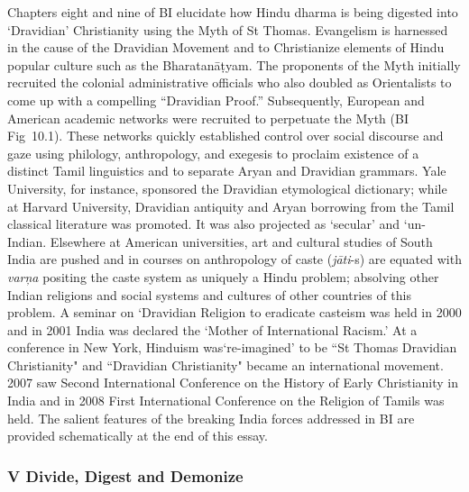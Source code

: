 Chapters eight and nine of BI elucidate how Hindu dharma is being digested into ‘Dravidian’ Christianity using the Myth of St Thomas. Evangelism is harnessed in the cause of the Dravidian Movement and to Christianize elements of Hindu popular culture such as the Bharatanāṭyam. The proponents of the Myth initially recruited the colonial administrative officials who also doubled as Orientalists to come up with a compelling “Dravidian Proof.” Subsequently, European and American academic networks were recruited to perpetuate the Myth (BI Fig~10.1). These networks quickly established control over social discourse and gaze using philology, anthropology, and exegesis to proclaim existence of a distinct Tamil linguistics and to separate Aryan and Dravidian grammars. Yale University, for instance, sponsored the Dravidian etymological dictionary; while at Harvard University, Dravidian antiquity and Aryan borrowing from the Tamil classical literature was promoted. It was also projected as ‘secular’ and ‘un-Indian. Elsewhere at American universities, art and cultural studies of South India are pushed and in courses on anthropology of caste (\textit{jāti}-s) are equated with \textit{varņa} positing the caste system as uniquely a Hindu problem; absolving other Indian religions and social systems and cultures of other countries of this problem. A seminar on ‘Dravidian Religion to eradicate casteism was held in 2000 and in 2001 India was declared the ‘Mother of International Racism.’ At a conference in New York, Hinduism was‘re-imagined’ to be ``St Thomas Dravidian Christianity" and ``Dravidian Christianity" became an international movement. 2007 saw Second International Conference on the History of Early Christianity in India and in 2008 First International Conference on the Religion of Tamils was held. The salient features of the breaking India forces addressed in BI are provided schematically at the end of this essay.


\subsubsection*{V Divide, Digest and Demonize}

\vskip -6pt

